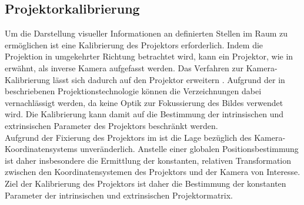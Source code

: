 


\prever{
}

\subsection{Projektorkalibrierung}
\label{chap.projcalib}
Um die Darstellung visueller Informationen an definierten Stellen im Raum zu ermöglichen ist eine Kalibrierung des Projektors erforderlich. Indem die Projektion in umgekehrter Richtung betrachtet wird, kann ein Projektor, wie in  erwähnt, als inverse Kamera aufgefasst werden. Das Verfahren zur Kamera-Kalibrierung lässt sich dadurch auf den Projektor erweitern \cite{Falcao2008}. Aufgrund der in  beschriebenen Projektionstechnologie können die Verzeichnungen dabei vernachlässigt werden, da keine Optik zur Fokussierung des Bildes verwendet wird. Die Kalibrierung kann damit auf die Bestimmung der intrinsischen und extrinsischen Parameter des Projektors beschränkt werden.\\

Aufgrund der Fixierung des Projektors im \kps{} ist die Lage bezüglich des Kamera-Koordinatensystems unveränderlich. Anstelle einer globalen Positionsbestimmung ist daher insbesondere die Ermittlung der konstanten, relativen Transformation zwischen den Koordinatensystemen des Projektors und der Kamera von Interesse. Ziel der Kalibrierung des Projektors ist daher die Bestimmung der konstanten Parameter der intrinsischen und extrinsischen Projektormatrix.\\

